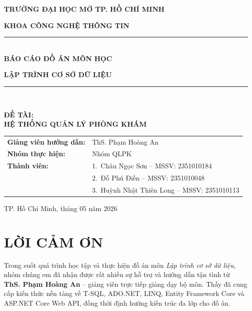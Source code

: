 \documentclass[12pt,a4paper]{report}
\begin{document}
\begin{titlepage}
\centering
\vspace*{0.4cm}
{\large\textbf{TRƯỜNG ĐẠI HỌC MỞ TP. HỒ CHÍ MINH}\par}
{\large\textbf{KHOA CÔNG NGHỆ THÔNG TIN}\par}
\vspace{0.8cm}

\rule{\linewidth}{0.5mm}\\[0.4cm]
{\huge\bfseries BÁO CÁO ĐỒ ÁN MÔN HỌC\\[0.3cm]}
{\Large\bfseries LẬP TRÌNH CƠ SỞ DỮ LIỆU\par}
\rule{\linewidth}{0.5mm}\\[0.8cm]

{\Huge\bfseries\color{blue!60!black} ĐỀ TÀI:\\[0.3cm]
HỆ THỐNG QUẢN LÝ PHÒNG KHÁM\par}

\vfill

\begin{flushleft}
\renewcommand{\arraystretch}{1.4}
\begin{tabular}{ll}
\textbf{Giảng viên hướng dẫn:} & ThS. Phạm Hoàng An \\
\textbf{Nhóm thực hiện:}       & Nhóm QLPK \\
\textbf{Thành viên:}           & 1.\ Châu Ngọc Sơn \hfill -- MSSV: 2351010184 \\
                               & 2.\ Đỗ Phú Điền \hfill -- MSSV: 2351010048 \\
                               & 3.\ Huỳnh Nhật Thiên Long \hfill -- MSSV: 2351010113 \\
\end{tabular}
\end{flushleft}

\vfill
{\large TP. Hồ Chí Minh, tháng 05 năm 2026 \par}
\end{titlepage}

\thispagestyle{empty}
\chapter*{LỜI CẢM ƠN}

Trong suốt quá trình học tập và thực hiện đồ án môn \textit{Lập trình cơ sở dữ liệu}, nhóm chúng em đã nhận được rất nhiều sự hỗ trợ và hướng dẫn tận tình từ \textbf{ThS. Phạm Hoàng An} -- giảng viên trực tiếp giảng dạy bộ môn. Thầy đã cung cấp kiến thức nền tảng về T-SQL, ADO.NET, LINQ, Entity Framework Core và ASP.NET Core Web API, đồng thời định hướng kiến trúc đa lớp cho đồ án.
\end{document}

